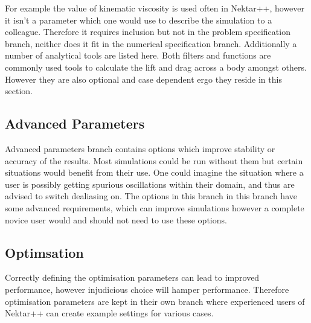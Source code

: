 \documentclass[11pt, a4paper]{report}
\begin{document}
For example the value of kinematic viscosity is used often in Nektar++, however it isn't a parameter which one would use to describe the simulation to a colleague. Therefore it requires inclusion but not in the problem specification branch, neither does it fit in the numerical specification branch. Additionally a number of analytical tools are listed here. Both filters and functions are commonly used tools to calculate the lift and drag across a body amongst others. However they are also optional and case dependent ergo they reside in this section.

\subsection{Advanced Parameters}
Advanced parameters branch contains options which improve stability or accuracy of the results. Most simulations could be run without them but certain situations would benefit from their use. One could imagine the situation where a user is possibly getting spurious oscillations within their domain, and thus are advised to switch dealiasing on. The options in this branch in this branch have some advanced requirements, which can improve simulations however a complete novice user would and should not need to use these options.

\subsection{Optimsation}
Correctly defining the optimisation parameters can lead to improved performance, however injudicious choice will hamper performance. Therefore optimisation parameters are kept in their own branch where experienced users of Nektar++ can create example settings for various cases.
\end{document}

